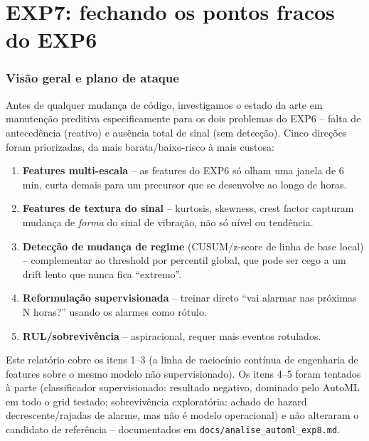 \documentclass[11pt,a4paper]{article}
\begin{document}
\clearpage
\part{EXP7: fechando os pontos fracos do EXP6}
\label{part:exp7}

\section{Visão geral e plano de ataque}

Antes de qualquer mudança de código, investigamos o estado da arte em
manutenção preditiva especificamente para os dois problemas do EXP6 --
falta de antecedência (reativo) e ausência total de sinal (sem detecção).
Cinco direções foram priorizadas, da mais barata/baixo-risco à mais
custosa:

\begin{enumerate}
  \item \textbf{Features multi-escala} -- as features do EXP6 só olham uma
        janela de 6 min, curta demais para um precursor que se desenvolve
        ao longo de horas.
  \item \textbf{Features de textura do sinal} -- kurtosis, skewness, crest
        factor capturam mudança de \emph{forma} do sinal de vibração, não
        só nível ou tendência.
  \item \textbf{Detecção de mudança de regime} (CUSUM/z-score de linha de
        base local) -- complementar ao threshold por percentil global,
        que pode ser cego a um drift lento que nunca fica ``extremo''.
  \item \textbf{Reformulação supervisionada} -- treinar direto ``vai
        alarmar nas próximas N horas?'' usando os alarmes como rótulo.
  \item \textbf{RUL/sobrevivência} -- aspiracional, requer mais eventos
        rotulados.
\end{enumerate}

Este relatório cobre os itens 1--3 (a linha de raciocínio contínua de
engenharia de features sobre o mesmo modelo não supervisionado). Os itens
4--5 foram tentados à parte (classificador supervisionado: resultado
negativo, dominado pelo AutoML em todo o grid testado; sobrevivência
exploratória: achado de hazard decrescente/rajadas de alarme, mas não é
modelo operacional) e não alteraram o candidato de referência --
documentados em \texttt{docs/analise\_automl\_exp8.md}.
\end{document}

